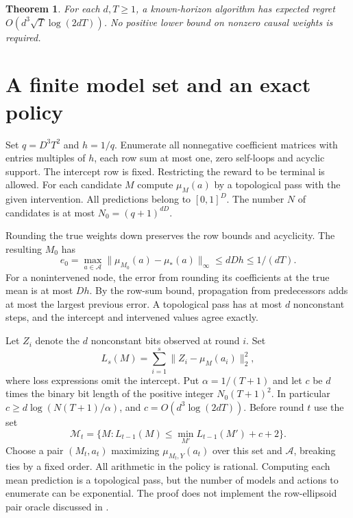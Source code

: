 \documentclass[11pt,a4paper]{amsart}
\newtheorem{theorem}{Theorem}
\begin{document}
\begin{theorem}
For each $d,T\geq1$, a known-horizon algorithm has expected regret $O(d^3\sqrt{T}\log(2dT))$. No positive lower bound on nonzero causal weights is required.
\end{theorem}

\section{A finite model set and an exact policy}
Set $q=D^3T^2$ and $h=1/q$. Enumerate all nonnegative coefficient matrices with entries multiples of $h$, each row sum at most one, zero self-loops and acyclic support. The intercept row is fixed. Restricting the reward to be terminal is allowed. For each candidate $M$ compute $\mu_M(a)$ by a topological pass with the given intervention. All predictions belong to $[0,1]^D$. The number $N$ of candidates is at most $N_0=(q+1)^{dD}$.

Rounding the true weights down preserves the row bounds and acyclicity. The resulting $M_0$ has
\[
 e_0=\max_{a\in\mathcal A}\|\mu_{M_0}(a)-\mu_*(a)\|_\infty
 \leq dDh\leq 1/(dT).
\]
For a nonintervened node, the error from rounding its coefficients at the true mean is at most $Dh$. By the row-sum bound, propagation from predecessors adds at most the largest previous error. A topological pass has at most $d$ nonconstant steps, and the intercept and intervened values agree exactly.

Let $Z_i$ denote the $d$ nonconstant bits observed at round $i$. Set
\[
       L_s(M)=\sum_{i=1}^s\|Z_i-\mu_M(a_i)\|_2^2 ,
\]
where loss expressions omit the intercept. Put $\alpha=1/(T+1)$ and let $c$ be $d$ times the binary bit length of the positive integer $N_0(T+1)^2$. In particular $c\geq d\log(N(T+1)/\alpha)$, and $c=O(d^3\log(2dT))$. Before round $t$ use the set
\[
 \mathcal M_t=\{M:L_{t-1}(M)\leq \min_{M'}L_{t-1}(M')+c+2\}.
\]
Choose a pair $(M_t,a_t)$ maximizing $\mu_{M_t,Y}(a_t)$ over this set and $\mathcal A$, breaking ties by a fixed order. All arithmetic in the policy is rational. Computing each mean prediction is a topological pass, but the number of models and actions to enumerate can be exponential. The proof does not implement the row-ellipsoid pair oracle discussed in \cite{feng}.
\end{document}
